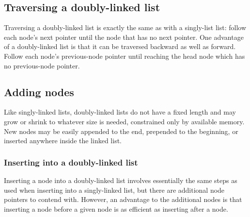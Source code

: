 \documentclass{article}
\begin{document}

  \subsection{Traversing a doubly-linked list}
  Traversing a doubly-linked list is exactly the same as with a singly-list list: follow each node's next pointer until the node that has no next pointer. One advantage of a doubly-linked list is that it can be traversed backward as well as forward. Follow each node's previous-node pointer until reaching the head node which has no previous-node pointer.
  \subsection{Adding nodes}
  Like singly-linked lists, doubly-linked lists do not have a fixed length and may grow or shrink to whatever size is needed, constrained only by available memory. New nodes may be easily appended to the end, prepended to the beginning, or inserted anywhere inside the linked list.
  \subsubsection{Inserting into a doubly-linked list}
  Inserting a node into a doubly-linked list involves essentially the same steps as used when inserting into a singly-linked list, but there are additional node pointers to contend with. However, an advantage to the additional nodes is that inserting a node before a given node is as efficient as inserting after a node.
\end{document}
